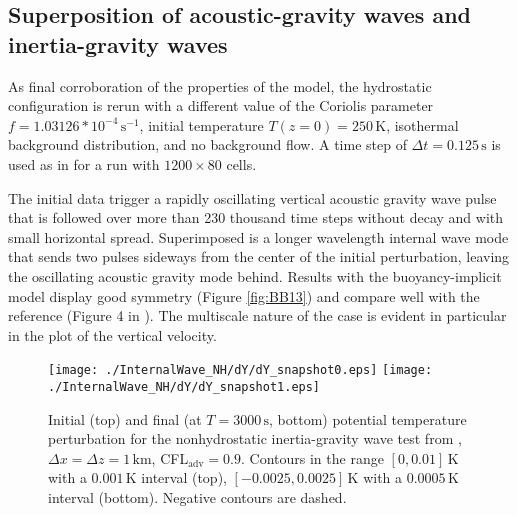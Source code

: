 \documentclass[12pt,a4paper]{article}
\theoremstyle{definition}
\newcommand{\dt}{\Delta t}
\begin{document}
\subsection{Superposition of acoustic-gravity waves and inertia-gravity waves}

As final corroboration of the properties of the model, the hydrostatic configuration is rerun with a different value of the Coriolis parameter $f=1.03126*10^{-4}\,\textrm{s}^{-1}$, initial temperature $T(z=0)=250\,\textrm{K}$, isothermal background distribution, and no background flow. A time step of $\dt=0.125\,\textrm{s}$ is used as in \cite{BaldaufBrdar2013} for a run with $1200\times80$ cells. 

The initial data trigger a rapidly oscillating vertical acoustic gravity wave pulse that is followed over more than 230 thousand time steps without decay and with small horizontal spread. Superimposed is a longer wavelength internal wave mode that sends two pulses sideways from the center of the initial perturbation, leaving the oscillating acoustic gravity mode behind. Results with the buoyancy-implicit model display good symmetry (Figure \ref{fig:BB13}) and compare well with the reference (Figure 4 in \cite{BaldaufBrdar2013}). The multiscale nature of the case is evident in particular in the plot of the vertical velocity.

\begin{figure}
\centering
 \texttt{[image: ./InternalWave\_NH/dY/dY\_snapshot0.eps]}
 \texttt{[image: ./InternalWave\_NH/dY/dY\_snapshot1.eps]}
 \caption{Initial (top) and final (at $T=3000\,\textrm{s}$, bottom) potential temperature perturbation for the nonhydrostatic inertia-gravity wave test from \cite{SkamarockKlemp1994}, $\Delta x=\Delta z=1\,\textrm{km}$, CFL$_\textrm{adv}=0.9$. Contours in the range $[0, 0.01]\,\textrm{K}$ with a $0.001\,\textrm{K}$ interval (top), $[-0.0025, 0.0025]\,\textrm{K}$ with a $0.0005\,\textrm{K}$ interval (bottom). Negative contours are dashed.}
 \label{fig:SK94_NH}
\end{figure}
\end{document}
